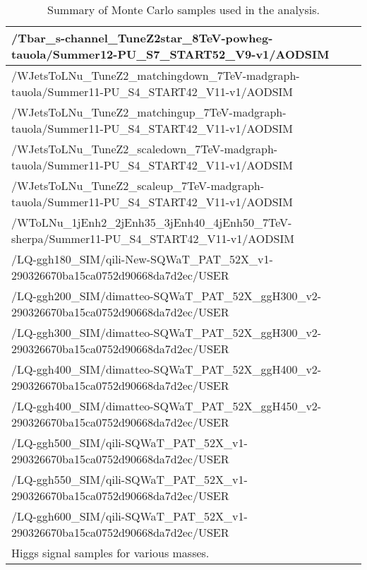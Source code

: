 \begin{sidewaystable}[htb]
\begin{center}
\begin{tabular}{|l|}
      /Tbar\_s-channel\_TuneZ2star\_8TeV-powheg-tauola/Summer12-PU\_S7\_START52\_V9-v1/AODSIM   \\
      \hline
      /WJetsToLNu\_TuneZ2\_matchingdown\_7TeV-madgraph-tauola/Summer11-PU\_S4\_START42\_V11-v1/AODSIM  \\
      /WJetsToLNu\_TuneZ2\_matchingup\_7TeV-madgraph-tauola/Summer11-PU\_S4\_START42\_V11-v1/AODSIM  \\
      /WJetsToLNu\_TuneZ2\_scaledown\_7TeV-madgraph-tauola/Summer11-PU\_S4\_START42\_V11-v1/AODSIM          \\
      /WJetsToLNu\_TuneZ2\_scaleup\_7TeV-madgraph-tauola/Summer11-PU\_S4\_START42\_V11-v1/AODSIM            \\
      /WToLNu\_1jEnh2\_2jEnh35\_3jEnh40\_4jEnh50\_7TeV-sherpa/Summer11-PU\_S4\_START42\_V11-v1/AODSIM      \\
      \hline 
      /LQ-ggh180\_SIM/qili-New-SQWaT\_PAT\_52X\_v1-290326670ba15ca0752d90668da7d2ec/USER   \\
      /LQ-ggh200\_SIM/dimatteo-SQWaT\_PAT\_52X\_ggH300\_v2-290326670ba15ca0752d90668da7d2ec/USER   \\	
      /LQ-ggh300\_SIM/dimatteo-SQWaT\_PAT\_52X\_ggH300\_v2-290326670ba15ca0752d90668da7d2ec/USER  \\ 
      /LQ-ggh400\_SIM/dimatteo-SQWaT\_PAT\_52X\_ggH400\_v2-290326670ba15ca0752d90668da7d2ec/USER  \\
      /LQ-ggh400\_SIM/dimatteo-SQWaT\_PAT\_52X\_ggH450\_v2-290326670ba15ca0752d90668da7d2ec/USER   \\
      /LQ-ggh500\_SIM/qili-SQWaT\_PAT\_52X\_v1-290326670ba15ca0752d90668da7d2ec/USER   \\
      /LQ-ggh550\_SIM/qili-SQWaT\_PAT\_52X\_v1-290326670ba15ca0752d90668da7d2ec/USER   \\
      /LQ-ggh600\_SIM/qili-SQWaT\_PAT\_52X\_v1-290326670ba15ca0752d90668da7d2ec/USER   \\
     Higgs signal samples for various masses.  \\
      \hline
    \end{tabular}
  \end{center}
  \caption{Summary of Monte Carlo samples used in the analysis.}
  \label{tab:MCsamples}
\end{sidewaystable}

